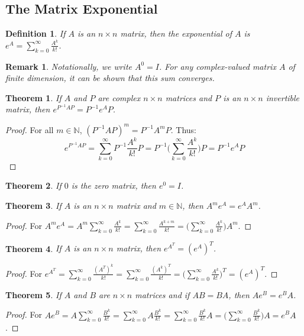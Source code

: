 \documentclass{article}
\theoremstyle{mystyle}
\newtheorem{theorem}{Theorem}[section]
\newtheorem{definition}{Definition}[section]
\newtheorem{remark}{Remark}[section]
\begin{document}
\subsection{The Matrix Exponential}
\begin{definition}
If $A$ is an $n\times n$ matrix, then the exponential of $A$ is $e^{A} =\sum_{k=0}^{\infty} \frac{A^k}{k!}$.
\end{definition}
\begin{remark}
Notationally, we write $A^0 = I$. For any complex-valued matrix $A$ of finite dimension, it can be shown that this sum converges.
\end{remark}
\begin{theorem}
If $A$ and $P$ are complex $n\times n$ matrices and $P$ is an $n\times n$ invertible matrix, then $e^{P^{-1}AP} = P^{-1}e^{A}P$.
\end{theorem}
\begin{proof}
For all $m\in \mathbb{N}$, $(P^{-1}AP)^{m} = P^{-1}A^mP$. Thus:
\begin{equation*}
    e^{P^{-1}AP} = \sum_{k=0}^{\infty} P^{-1}\frac{A^k}{k!}P = P^{-1}\big(\sum_{k=0}^{\infty} \frac{A^k}{k!}\big)P = P^{-1}e^A P
\end{equation*}
\end{proof}
\begin{theorem}
If $0$ is the zero matrix, then $e^0 = I$.
\end{theorem}
\begin{theorem}
If $A$ is an $n\times n$ matrix and $m\in \mathbb{N}$, then $A^{m} e^{A} = e^{A} A^{m}$.
\end{theorem}
\begin{proof}
For $A^{m} e^{A} = A^{m} \sum_{k=0}^{\infty} \frac{A^{k}}{k!} = \sum_{k=0}^{\infty} \frac{A^{k+m}}{k!} = \big(\sum_{k=0}^{\infty} \frac{A^k}{k!}\big)A^{m}$.
\end{proof}
\begin{theorem}
If $A$ is an $n\times n$ matrix, then $e^{A^{T}} = (e^{A})^{T}$.
\end{theorem}
\begin{proof}
For $e^{A^{T}} = \sum_{k=0}^{\infty} \frac{(A^{T})^{k}}{k!} = \sum_{k=0}^{\infty} \frac{(A^{k})^{T}}{k!} = \big(\sum_{k=0}^{\infty} \frac{A^{k}}{k!}\big)^{T} = (e^{A})^{T}$.
\end{proof}
\begin{theorem}
If $A$ and $B$ are $n\times n$ matrices and if $AB = BA$, then $Ae^{B} = e^{B} A$.
\end{theorem}
\begin{proof}
For $Ae^{B} = A\sum_{k=0}^{\infty} \frac{B^{k}}{k!} = \sum_{k=0}^{\infty} A\frac{B^{k}}{k!} = \sum_{k=0}^{\infty} \frac{B^{k}}{k!}A = \big(\sum_{k=0}^{\infty} \frac{B^{k}}{k!}\big)A = e^{B}A$.
\end{proof}
\end{document}
